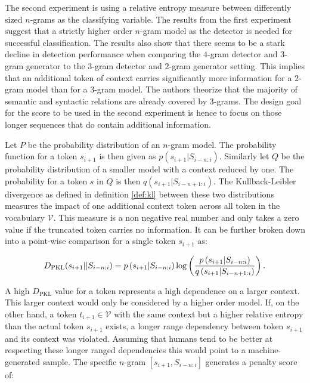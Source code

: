     The second experiment is using a relative entropy measure between differently sized $n$-grams as the classifying variable.
    The results from the first experiment suggest that a strictly higher order $n$-gram model as the detector is needed for successful classification.
    The results also show that there seems to be a stark decline in detection performance when comparing the $4$-gram detector and $3$-gram generator to the $3$-gram detector and $2$-gram generator setting.
    This implies that an additional token of context carries significantly more information for a $2$-gram model than for a $3$-gram model.
    The authors theorize that the majority of semantic and syntactic relations are already covered by $3$-grams.
    The design goal for the score to be used in the second experiment is hence to focus on those longer sequences that do contain additional information.

    Let $P$ be the probability distribution of an $n$-gram model.
    The probability function for a token $s_{i+1}$ is then given as $p\left(s_{i+1} | S_{i-n:i}\right)$.
    Similarly let $Q$ be the probability distribution of a smaller model with a context reduced by one.
    The probability for a token $s$ in $Q$ is then $q \left(s_{i+1} | S_{i-n+1:i}\right)$.
    The Kullback-Leibler divergence as defined in definition \ref{def:kl} between these two distributions measures the impact of one additional context token across all token in the vocabulary $\mathcal{V}$.
    This measure is a non negative real number and only takes a zero value if the truncated token carries no information.
    It can be further broken down into a point-wise comparison for a single token $s_{i+1}$ as:

    \begin{equation}
    \label{eq:pkl}
        D_{\mathrm{PKL}}(s_{i+1} || S_{i-n:i}) = p\left(s_{i+1} | S_{i-n:i}\right) \log \left( \\
        \frac{p\left(s_{i+1} | S_{i-n:i}\right)}{q \left(s_{i+1} | S_{i-n+1:i}\right)}  \right) \text{.}
    \end{equation}

    A high $D_{\mathrm{PKL}}$ value for a token represents a high dependence on a larger context.
    This larger context would only be considered by a higher order model.
    If, on the other hand, a token $t_{i+1} \in \mathcal{V}$ with the same context but a higher relative entropy than the actual token $s_{i+1}$ exists, a longer range dependency between token $s_{i+1}$ and its context was violated.
    Assuming that humans tend to be better at respecting these longer ranged dependencies this would point to a machine-generated sample.
    The specific $n$-gram $[s_{i+1}, S_{i-n:i}]$ generates a penalty score of:


